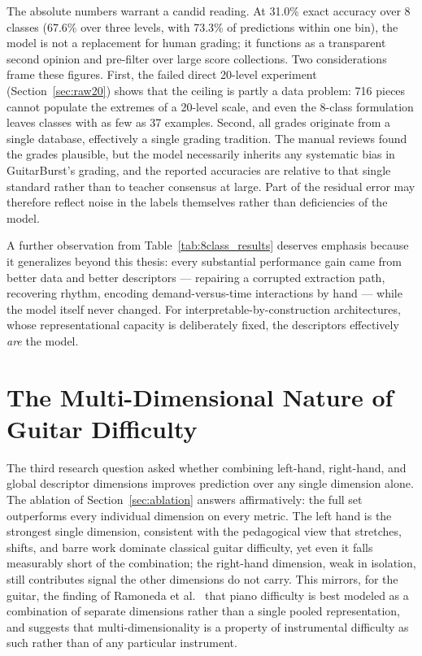 The absolute numbers warrant a candid reading. At 31.0\% exact accuracy over 8 classes (67.6\% over three levels, with 73.3\% of predictions within one bin), the model is not a replacement for human grading; it functions as a transparent second opinion and pre-filter over large score collections. Two considerations frame these figures. First, the failed direct 20-level experiment (Section~\ref{sec:raw20}) shows that the ceiling is partly a data problem: 716 pieces cannot populate the extremes of a 20-level scale, and even the 8-class formulation leaves classes with as few as 37 examples. Second, all grades originate from a single database, effectively a single grading tradition. The manual reviews found the grades plausible, but the model necessarily inherits any systematic bias in GuitarBurst's grading, and the reported accuracies are relative to that single standard rather than to teacher consensus at large. Part of the residual error may therefore reflect noise in the labels themselves rather than deficiencies of the model.

A further observation from Table~\ref{tab:8class_results} deserves emphasis because it generalizes beyond this thesis: every substantial performance gain came from better data and better descriptors --- repairing a corrupted extraction path, recovering rhythm, encoding demand-versus-time interactions by hand --- while the model itself never changed. For interpretable-by-construction architectures, whose representational capacity is deliberately fixed, the descriptors effectively \emph{are} the model.

\section{The Multi-Dimensional Nature of Guitar Difficulty}
\label{sec:disc_dimensions}
The third research question asked whether combining left-hand, right-hand, and global descriptor dimensions improves prediction over any single dimension alone. The ablation of Section~\ref{sec:ablation} answers affirmatively: the full set outperforms every individual dimension on every metric. The left hand is the strongest single dimension, consistent with the pedagogical view that stretches, shifts, and barre work dominate classical guitar difficulty, yet even it falls measurably short of the combination; the right-hand dimension, weak in isolation, still contributes signal the other dimensions do not carry. This mirrors, for the guitar, the finding of Ramoneda et al.~\cite{ramoneda2024combining} that piano difficulty is best modeled as a combination of separate dimensions rather than a single pooled representation, and suggests that multi-dimensionality is a property of instrumental difficulty as such rather than of any particular instrument.

